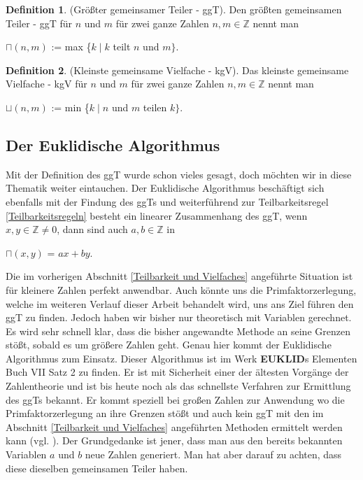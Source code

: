 \documentclass[12pt,a4paper]{article}
\theoremstyle{definition}
\newtheorem{defi}{Definition}[section]
\begin{document}
\begin{defi}(Größter gemeinsamer Teiler - ggT).\newline
Den größten gemeinsamen Teiler - ggT für $n$ und $m$ für zwei ganze Zahlen $n, m\in \mathbb{Z}$ nennt man
\begin{center}
$\sqcap(n, m)$ := max \{$k \mid k$ teilt $n$ und $m\}$.
\end{center}
\end{defi}

\begin{defi}(Kleinste gemeinsame Vielfache - kgV).\newline
Das kleinste gemeinsame Vielfache - kgV für $n$ und $m$ für zwei ganze Zahlen $n, m\in \mathbb{Z}$ nennt man
\begin{center}
$\sqcup(n, m)$ := min \{$k \mid n$ und $m$ teilen $k\}$.
\end{center}
\end{defi}

\newpage
\subsection{Der Euklidische Algorithmus}\label{Der Euklidische Algorithmus}
Mit der Definition des ggT wurde schon vieles gesagt, doch möchten wir in diese Thematik weiter eintauchen.
Der Euklidische Algorithmus beschäftigt sich ebenfalls mit der Findung des ggTs und weiterführend zur Teilbarkeitsregel \ref{Teilbarkeitsregeln} besteht ein linearer Zusammenhang des ggT, wenn $x, y \in \mathbb{Z} \neq 0$, dann sind auch $a, b \in \mathbb{Z}$ in
\begin{center}
$\sqcap(x, y)$ = $ax + by$.
\end{center}
Die im vorherigen Abschnitt \ref{Teilbarkeit und Vielfaches} angeführte Situation ist für kleinere Zahlen perfekt anwendbar.
Auch könnte uns die Primfaktorzerlegung, welche im weiteren Verlauf dieser Arbeit behandelt wird, uns ans Ziel führen den ggT zu finden.
Jedoch haben wir bisher nur theoretisch mit Variablen gerechnet.
Es wird sehr schnell klar, dass die bisher angewandte Methode an seine Grenzen stößt, sobald es um größere Zahlen geht.
Genau hier kommt der Euklidische Algorithmus zum Einsatz.
Dieser Algorithmus ist im Werk \textbf{EUKLID}s Elementen Buch VII Satz 2 zu finden.
Er ist mit Sicherheit einer der ältesten Vorgänge der Zahlentheorie und ist bis heute noch als das schnellste Verfahren zur Ermittlung des ggTs bekannt.
Er kommt speziell bei großen Zahlen zur Anwendung wo die Primfaktorzerlegung an ihre Grenzen stößt und auch kein ggT mit den im Abschnitt \ref{Teilbarkeit und Vielfaches} angeführten Methoden ermittelt werden kann (vgl. \cite[83--84]{Crandall2005}).\newline
Der Grundgedanke ist jener, dass man aus den bereits bekannten Variablen $a$ und $b$ neue Zahlen generiert.
Man hat aber darauf zu achten, dass diese dieselben gemeinsamen Teiler haben.
\end{document}
